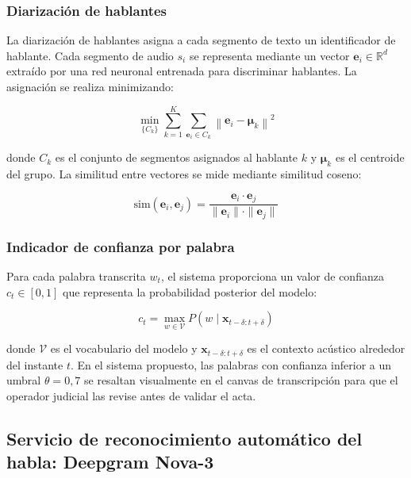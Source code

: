 \documentclass[12pt,a4paper,oneside]{article}
\begin{document}
\subsubsection{Diarizaci\'on de hablantes}

La diarizaci\'on de hablantes asigna a cada segmento de texto un identificador de hablante. Cada segmento de audio $s_i$ se representa mediante un vector $\mathbf{e}_i \in \mathbb{R}^d$ extra\'ido por una red neuronal entrenada para discriminar hablantes. La asignaci\'on se realiza minimizando:

\begin{equation}
\min_{\{C_k\}} \sum_{k=1}^{K} \sum_{\mathbf{e}_i \in C_k} \left\| \mathbf{e}_i - \boldsymbol{\mu}_k \right\|^2
\end{equation}

donde $C_k$ es el conjunto de segmentos asignados al hablante $k$ y $\boldsymbol{\mu}_k$ es el centroide del grupo. La similitud entre vectores se mide mediante similitud coseno:

\begin{equation}
\text{sim}(\mathbf{e}_i, \mathbf{e}_j) = \frac{\mathbf{e}_i \cdot \mathbf{e}_j}{\|\mathbf{e}_i\| \cdot \|\mathbf{e}_j\|}
\end{equation}

\subsubsection{Indicador de confianza por palabra}

Para cada palabra transcrita $w_t$, el sistema proporciona un valor de confianza $c_t \in [0, 1]$ que representa la probabilidad posterior del modelo:

\begin{equation}
c_t = \max_{w \in \mathcal{V}} P(w \mid \mathbf{x}_{t-\delta:t+\delta})
\end{equation}

donde $\mathcal{V}$ es el vocabulario del modelo y $\mathbf{x}_{t-\delta:t+\delta}$ es el contexto ac\'ustico alrededor del instante $t$. En el sistema propuesto, las palabras con confianza inferior a un umbral $\theta = 0{,}7$ se resaltan visualmente en el canvas de transcripci\'on para que el operador judicial las revise antes de validar el acta.

\subsection{Servicio de reconocimiento autom\'atico del habla: Deepgram Nova-3}
\end{document}
